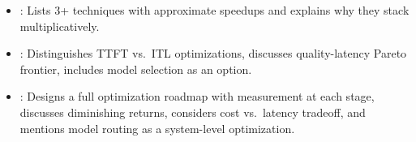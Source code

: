 \begin{interviewq}

\goodgreat
\begin{itemize}
    \item {}: Lists 3+ techniques with approximate speedups and explains
          why they stack multiplicatively.
    \item {}: Distinguishes TTFT vs.\ ITL optimizations, discusses
          quality-latency Pareto frontier, includes model selection as an option.
    \item {}: Designs a full optimization roadmap with measurement at each
          stage, discusses diminishing returns, considers cost vs.\ latency tradeoff,
          and mentions model routing as a system-level optimization.
\end{itemize}

\end{interviewq}

\vspace{0.5em}

